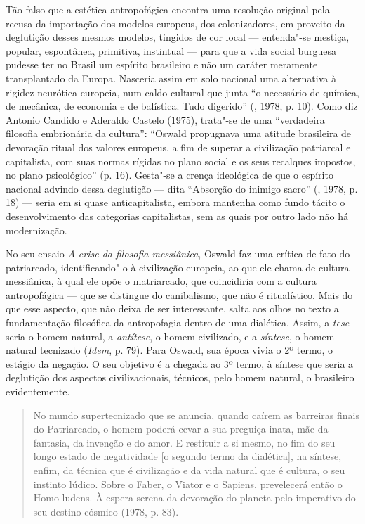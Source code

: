 Tão falso que a estética antropofágica encontra uma resolução original
pela recusa da importação dos modelos europeus, dos colonizadores, em
proveito da deglutição desses mesmos modelos, tingidos de cor local ---
entenda"-se mestiça, popular, espontânea, primitiva, instintual --- para
que a vida social burguesa pudesse ter no Brasil um espírito brasileiro
e não um caráter meramente transplantado da Europa. Nasceria assim em
solo nacional uma alternativa à rigidez neurótica europeia, num caldo
cultural que junta ``o necessário de química, de mecânica, de economia e
de balística. Tudo digerido'' (, 1978, p. 10). Como diz Antonio
Candido e Aderaldo Castelo (1975), trata"-se de uma ``verdadeira
filosofia embrionária da cultura'': ``Oswald propugnava uma atitude
brasileira de devoração ritual dos valores europeus, a fim de superar a
civilização patriarcal e capitalista, com suas normas rígidas no plano
social e os seus recalques impostos, no plano psicológico'' (p. 16).
Gesta"-se a crença ideológica de que o espírito nacional advindo dessa
deglutição --- dita ``Absorção do inimigo sacro'' (, 1978, p. 18)
--- seria em si quase anticapitalista, embora mantenha como fundo tácito
o desenvolvimento das categorias capitalistas, sem as quais por outro
lado não há modernização.

No seu ensaio \emph{A crise da filosofia messiânica}, Oswald faz uma
crítica de fato do patriarcado, identificando"-o à civilização europeia,
ao que ele chama de cultura messiânica, à qual ele opõe o matriarcado,
que coincidiria com a cultura antropofágica --- que se distingue do
canibalismo, que não é ritualístico. Mais do que esse aspecto, que não
deixa de ser interessante, salta aos olhos no texto a fundamentação
filosófica da antropofagia dentro de uma dialética. Assim, a \emph{tese}
seria o homem natural, a \emph{antítese}, o homem civilizado, e a
\emph{síntese}, o homem natural tecnizado (\emph{Idem}, p. 79). Para
Oswald, sua época vivia o 2º termo, o estágio da negação. O seu objetivo
é a chegada ao 3º termo, à síntese que seria a deglutição dos aspectos
civilizacionais, técnicos, pelo homem natural, o brasileiro
evidentemente.

\begin{quote}
No mundo supertecnizado que se anuncia, quando caírem as barreiras
finais do Patriarcado, o homem poderá cevar a sua preguiça inata, mãe da
fantasia, da invenção e do amor. E restituir a si mesmo, no fim do seu
longo estado de negatividade [o segundo termo da dialética], na
síntese, enfim, da técnica que é civilização e da vida natural que é
cultura, o seu instinto lúdico. Sobre o Faber, o Viator e o Sapiens,
prevelecerá então o Homo ludens. À espera serena da devoração do planeta
pelo imperativo do seu destino cósmico (1978, p. 83).
\end{quote}

